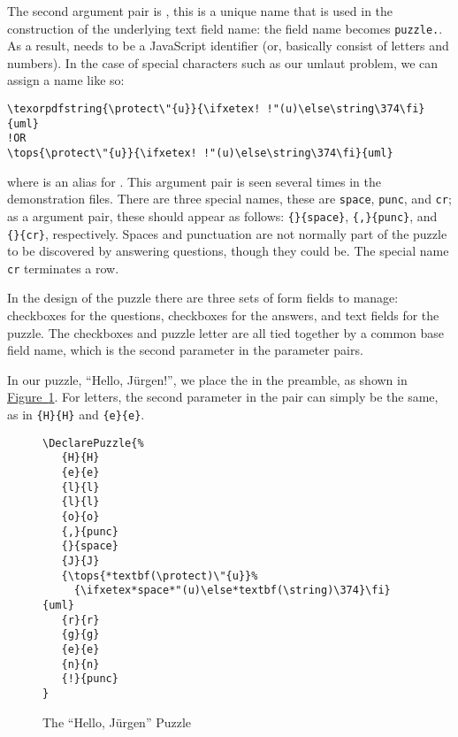 \documentclass{article}
\let\tops\texorpdfstring
\def\FmtMP#1{\marginpar{\slshape\raggedleft\small#1}}
\begin{document}
 The second argument pair is , this is a unique name that is used
 in the construction of the underlying text field name: the field name
 becomes \texttt{puzzle.}. As a result,  needs to be
 a JavaScript identifier (or, basically consist of letters and numbers). In
 the case of special characters such as our umlaut problem, we can assign a
 name like so:
\begin{Verbatim}[xleftmargin=\amtIndent,commandchars={!()},
  codes={\def\OR{\llap{\rlap{\textsf{or}}\kern15pt}}}]
\texorpdfstring{\protect\"{u}}{\ifxetex! !"(u)\else\string\374\fi}{uml}
!OR
\tops{\protect\"{u}}{\ifxetex! !"(u)\else\string\374\fi}{uml}
\end{Verbatim}
where \FmtMP{\cs{tops}} is an alias for . This
argument pair is seen several times in the demonstration files. There are
three special names, these are \texttt{space}, \texttt{punc}, and
\texttt{cr}; as a argument pair, these should appear as follows:
\verb!{}{space}!\FmtMP{\texttt{space}}, \verb~{,}{punc}~\FmtMP{\texttt{punc}}, and
\verb~{}{cr}~\FmtMP{\texttt{cr}}, respectively. Spaces and punctuation are not normally part of
the puzzle to be discovered by answering questions, though they could be.
The special name \texttt{cr} terminates a row.


\newtopic\indent
In the design of the puzzle there are three sets of form fields to
manage: checkboxes for the questions, checkboxes for the answers,
and text fields for the puzzle. The checkboxes and puzzle letter are
all tied together by a common base field name, which is the second
parameter in the parameter pairs.

\newtopic\indent
In our puzzle, ``Hello, J\"{u}rgen!'', we place the 
in the preamble, as shown in \hyperref[fig:HJ]{Figure~\ref*{fig:HJ}}.
For letters, the second parameter in the pair can simply be the same, as in
\verb!{H}{H}! and \verb!{e}{e}!.

\begin{figure}[htb]\centering
\begin{minipage}{3in}
\begin{Verbatim}[fontsize=\small,commandchars={*()}]
\DeclarePuzzle{%
   {H}{H}
   {e}{e}
   {l}{l}
   {l}{l}
   {o}{o}
   {,}{punc}
   {}{space}
   {J}{J}
   {\tops{*textbf(\protect)\"{u}}%
     {\ifxetex*space*"(u)\else*textbf(\string)\374}\fi}{uml}
   {r}{r}
   {g}{g}
   {e}{e}
   {n}{n}
   {!}{punc}
}
\end{Verbatim}
\end{minipage}
\caption{The ``Hello, J\"{u}rgen'' Puzzle}\label{fig:HJ}
\end{figure}
\end{document}
